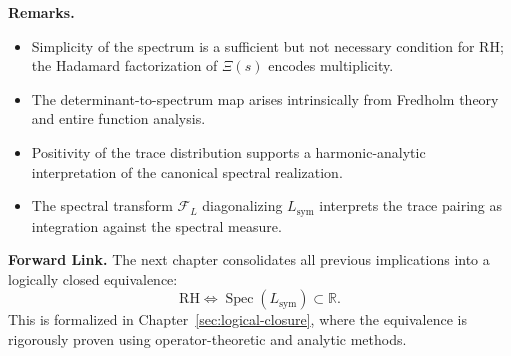 \medskip

\noindent
\textbf{Remarks.}
\begin{itemize}
  \item Simplicity of the spectrum is a sufficient but not necessary condition for RH; the Hadamard factorization of \( \Xi(s) \) encodes multiplicity.
  \item The determinant-to-spectrum map arises intrinsically from Fredholm theory and entire function analysis.
  \item Positivity of the trace distribution supports a harmonic-analytic interpretation of the canonical spectral realization.
  \item The spectral transform \( \mathcal{F}_L \) diagonalizing \( L_{\mathrm{sym}} \) interprets the trace pairing as integration against the spectral measure.
\end{itemize}

\medskip

\noindent
\textbf{Forward Link.}  
The next chapter consolidates all previous implications into a logically closed equivalence:
\[
\mathrm{RH} \iff \operatorname{Spec}(L_{\mathrm{sym}}) \subset \mathbb{R}.
\]
This is formalized in Chapter~\ref{sec:logical-closure}, where the equivalence is rigorously proven using operator-theoretic and analytic methods.
